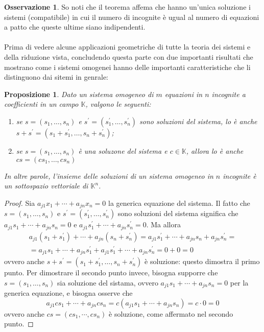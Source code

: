 \documentclass{book}
\theoremstyle{definition}
\newtheorem{oss}{Osservazione}[section]
\theoremstyle{plain}
\newtheorem{prop}{Proposizione}[section]
\begin{document}
\begin{oss}
  \label{oss:guess-jorda2}
  So noti che il teorema affema che hanno un'unica soluzione i sistemi
  (compatibile) in cui il numero di incognite è ugual al numero di
  equazioni a patto che queste ultime siano indipendenti.\\\\
  Prima di vedere alcune applicazioni geometriche di tutte la teoria
  dei sistemi e della riduzione vista, concludendo questa parte con due
  importanti risultati che mostrano come i sistemi omogenei hanno delle
  importanti caratteristiche che li distinguono dai sitemi in genrale:
\end{oss}
\begin{prop}
  \label{prop:gauss-jorda3}
  Dato un sistema omogeneo di $m$ equazioni in $n$ incognite a
  coefficienti in un campo $\mathds{K}$, valgono le seguenti:
  \begin{enumerate}
  \item se $s=(s_1,\dots,s_n)$ e $s^\prime=(s_1^\prime,\dots,s_n^\prime)$
    sono soluzioni del sistema, lo è anche $s+s^\prime=(s_1+s_1^\prime,
    \dots,s_n+s_n^\prime)$;
  \item se $s=(s_1,\dots,s_n)$ è una soluzone del sistema e $c\in
    \mathds{K}$, allora lo è anche $cs=(cs_1,\dots,cs_n)$
  \end{enumerate}
  In altre parole, l'insieme delle soluzioni di un sistema omogeneo in
  $n$ incognite è un sottospazio vettoriale di $\mathds{K}^n$.
\end{prop}
\begin{proof}
  Sia $a_{j1}x_1+\cdots+a_{jn}x_n=0$ la generica equazione del sistema. Il
  fatto che $s=(s_1,\dots,s_n)$ e $s^\prime=(s_1^\prime,\dots,s_n^\prime)$
  sono soluzioni del sistema significa che $a_{j1}s_1+\cdots+a_{jn}s_n=0$
  e $a_{j1}s_{1}^\prime+\cdots+a_{jn}s_n^\prime=0$. Ma allora
  \begin{equation}
    \label{eq:gauss-jorda3-1}
    \begin{matrix}
      a_{j1} (s_1+s^\prime_1) +\cdots+a_{jn}(s_n+s_n^\prime)=a_{j1}s_1^\prime+
      \cdots+a_{jn} s_n+a_{jn}s_n^\prime=\\
      =a_{j1}s_1+\cdots+a_{jn}s_1^\prime+a_{j1}s_1^\prime+\cdots+a_{jn}s_n^\prime=0+0=0
    \end{matrix}
  \end{equation}
  ovvero anche $s+s^\prime=(s_1+s_1^\prime,\dots,s_n+s_n^\prime)$ è
  soluzione: questo dimostra il primo punto.
  Per dimostrare il secondo punto invece, bisogna supporre che
  $s=(s_1,\dots,s_n)$ sia soluzione del sistama, ovvero
  $a_{j1}s_1+\cdots+a_{jn}s_n=0$ per la generica equazione, e bisogna
  osserve che
  \begin{equation}
    \label{eq:gauss-jorda3-2}
    a_{j1}cs_1+\cdots+a_{jn}cs_n=c(a_{j1}s_1+\cdots+a_{jn}s_n)=c\cdot0=0
  \end{equation}
  ovvero anche $cs=(cs_1,\cdots,cs_n)$ è soluzione, come affermato
  nel secondo punto.
\end{proof}
\end{document}

